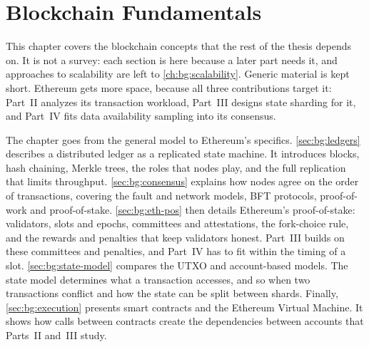 \chapter{Blockchain Fundamentals}\label{ch:bg:fundamentals}


This chapter covers the blockchain concepts that the rest of the thesis depends on.
It is not a survey: each section is here because a later part needs it, and approaches to scalability are left to \autoref{ch:bg:scalability}.
Generic material is kept short.
Ethereum gets more space, because all three contributions target it: Part~II analyzes its transaction workload, Part~III designs state sharding for it, and Part~IV fits data availability sampling into its consensus.

The chapter goes from the general model to Ethereum's specifics.
\autoref{sec:bg:ledgers} describes a distributed ledger as a replicated state machine.
It introduces blocks, hash chaining, Merkle trees, the roles that nodes play, and the full replication that limits throughput.
\autoref{sec:bg:consensus} explains how nodes agree on the order of transactions, covering the fault and network models, BFT protocols, proof-of-work and proof-of-stake.
\autoref{sec:bg:eth-pos} then details Ethereum's proof-of-stake: validators, slots and epochs, committees and attestations, the fork-choice rule, and the rewards and penalties that keep validators honest.
Part~III builds on these committees and penalties, and Part~IV has to fit within the timing of a slot.
\autoref{sec:bg:state-model} compares the UTXO and account-based models.
The state model determines what a transaction accesses, and so when two transactions conflict and how the state can be split between shards.
Finally, \autoref{sec:bg:execution} presents smart contracts and the Ethereum Virtual Machine.
It shows how calls between contracts create the dependencies between accounts that Parts~II and~III study.

